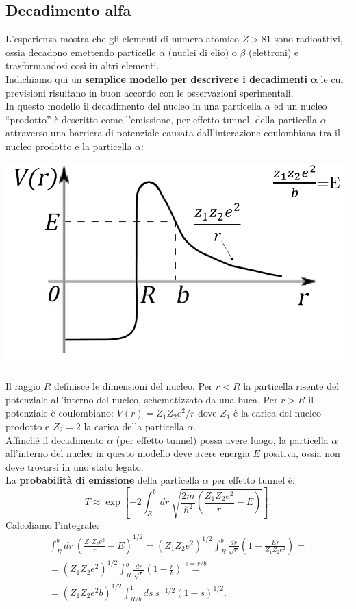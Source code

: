 \subsection{Decadimento alfa}
L'esperienza mostra che gli elementi di numero atomico $Z>81$ sono radioattivi, ossia decadono emettendo particelle $\alpha$ (nuclei di elio) o $\beta$ (elettroni) e trasformandosi così in altri elementi.\\
Indichiamo qui un \textbf{semplice modello per descrivere i decadimenti} $\mathbf{\alpha}$ le cui previsioni risultano in buon accordo con le osservazioni sperimentali.\\
In questo modello il decadimento del nucleo in una particella $\alpha$ ed un nucleo ``prodotto'' è descritto come l'emissione, per effetto tunnel, della particella $\alpha$ attraverso una barriera di potenziale causata dall'interazione coulombiana tra il nucleo prodotto e la particella $\alpha$:\\
\begin{center}
\includegraphics[width=.5\textwidth]{immagini/cap_10/fig_10_11.png}
\end{center}
Il raggio $R$ definisce le dimensioni del nucleo. Per $r<R$ la particella risente  del potenziale all'interno del nucleo, schematizzato da una buca. Per $r>R$ il potenziale è coulombiano: $V(r)=Z_1 Z_2 e^2/r$ dove $Z_1$ è la carica del nucleo prodotto e $Z_2=2$ la carica della particella $\alpha$.\\
Affinché il decadimento $\alpha$ (per effetto tunnel) possa avere luogo, la particella $\alpha$ all'interno del nucleo in questo modello deve avere energia $E$ positiva, ossia non deve trovarsi in uno stato legato.\\
La \textbf{probabilità di emissione} della particella $\alpha$ per effetto tunnel è:
\begin{equation}
T \approx \exp \left[ -2 \int _R ^b dr\ \sqrt{\frac{2m}{\hbar ^2}\left(\frac{Z_1 Z_2 e^2}{r}-E\right)}\right].
\end{equation}
Calcoliamo l'integrale:
\begin{eqnarray}
&\displaystyle{\int _R ^b dr\ \left(\frac{Z_1 Z_2 e^2}{r}-E\right)^{1/2}=\left(Z_1 Z_2 e^2\right)^{1/2}\int _R ^b \frac{dr}{\sqrt{r}}\left(1-\frac{Er}{Z_1 Z_2 e^2}\right)=}& \nonumber \\
&\displaystyle{=\left(Z_1 Z_2 e^2\right)^{1/2}\int _R ^b \frac{dr}{\sqrt{r}}\left(1-\frac{r}{b}\right)\overset{s=r/b}{=}}&\nonumber \\
&=\displaystyle{\left(Z_1 Z_2 e^2 b\right)^{1/2}\int _{R/b} ^1 ds\ s^{-1/2} (1-s)^{1/2}}.&
\end{eqnarray}
